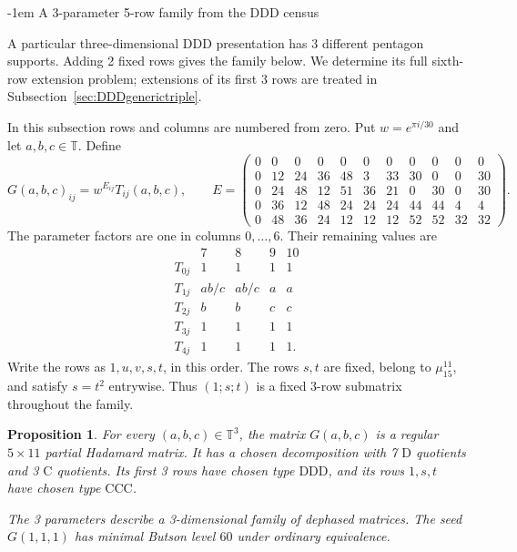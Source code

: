 \documentclass[11pt,a4paper]{article}
\makeatletter
\newtheorem{proposition}[theorem]{Proposition}
\theoremstyle{plain}
\theoremstyle{definition}
\theoremstyle{plain}
\renewcommand\subsection{\@startsection{subsection}{2}{\z@}  {\medskipamount}  {-1em}  {\normalfont\normalsize\bfseries}}
\makeatother
\begin{document}
\subsection{A 3-parameter 5-row family from the DDD census}\label{sec:DDDpositivefive}

A particular three-dimensional $\mathrm{DDD}$ presentation has 3 different pentagon supports. Adding 2 fixed rows gives the family below. We determine its full sixth-row extension problem; extensions of its first 3 rows are treated in Subsection~\ref{sec:DDDgenerictriple}.

\medskip
In this subsection rows and columns are numbered from zero. Put $w=e^{\pi i/30}$ and let $a,b,c\in\mathbb T$. Define
\[
G(a,b,c)_{ij}=w^{E_{ij}}T_{ij}(a,b,c),\qquad
E=\begin{pmatrix}
0&0&0&0&0&0&0&0&0&0&0\\
0&12&24&36&48&3&33&30&0&0&30\\
0&24&48&12&51&36&21&0&30&0&30\\
0&36&12&48&24&24&24&44&44&4&4\\
0&48&36&24&12&12&12&52&52&32&32
\end{pmatrix}.
\]
The parameter factors are one in columns $0,\ldots,6$. Their remaining values are
\[
\begin{array}{c|cccc}
 &7&8&9&10\\\hline
T_{0j}&1&1&1&1\\
T_{1j}&ab/c&ab/c&a&a\\
T_{2j}&b&b&c&c\\
T_{3j}&1&1&1&1\\
T_{4j}&1&1&1&1.
\end{array}
\]
Write the rows as $1,u,v,s,t$, in this order. The rows $s,t$ are fixed, belong to $\mu_{15}^{11}$, and satisfy $s=t^2$ entrywise. Thus $(1;s;t)$ is a fixed 3-row submatrix throughout the family.

\par\addvspace{\medskipamount}\noindent
\begin{minipage}{\linewidth}
\begin{proposition}\label{n11_positive:regular}
For every $(a,b,c)\in\mathbb T^3$, the matrix $G(a,b,c)$ is a regular $5\times11$ partial Hadamard matrix. It has a chosen decomposition with 7 $\mathrm{D}$ quotients and 3 $\mathrm{C}$ quotients. Its first 3 rows have chosen type $\mathrm{DDD}$, and its rows $1,s,t$ have chosen type $\mathrm{CCC}$.

The 3 parameters describe a 3-dimensional family of dephased matrices. The seed $G(1,1,1)$ has minimal Butson level $60$ under ordinary equivalence.
\end{proposition}
\end{minipage}
\par\addvspace{\medskipamount}
\end{document}
